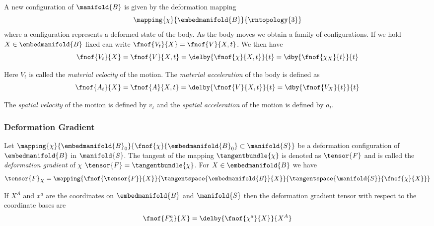 
A new configuration of $\manifold{B}$ is given by the deformation mapping
\begin{equation}
  \mapping{\chi}{\embedmanifold{B}}{\rntopology{3}}
\end{equation}
where a configuration represents a deformed state of the body. As the body
moves we obtain a family of configurations. If we hold $X\in\embedmanifold{B}$
fixed can write $\fnof{V_{t}}{X}=\fnof{V}{X,t}$. We then have
\begin{equation}
  \fnof{V_{t}}{X}=\fnof{V}{X,t}=\delby{\fnof{\chi}{X,t}}{t}=\dby{\fnof{\chi_{X}}{t}}{t}
\end{equation}

Here $V_{t}$ is called the \textit{material velocity} of the motion. The
\textit{material acceleration} of the body is defined as
\begin{equation}
  \fnof{A_{t}}{X}=\fnof{A}{X,t}=\delby{\fnof{V}{X,t}}{t}=\dby{\fnof{V_{X}}{t}}{t}
\end{equation}

The \textit{spatial velocity} of the motion is defined by $v_{t}$ and the
\textit{spatial acceleration} of the motion is defined by $a_{t}$.

\subsubsection{Deformation Gradient}

Let
$\mapping{\chi}{\embedmanifold{B}_{0}}{\fnof{\chi}{\embedmanifold{B}_{0}}\subset\manifold{S}}$
be a deformation configuration of $\embedmanifold{B}$ in $\manifold{S}$. The
tangent of the mapping \ie $\tangentbundle{\chi}$ is denoted as $\tensor{F}$
and is called the \textit{deformation gradient} of $\chi$ \ie
$\tensor{F}=\tangentbundle{\chi}$. For $X\in\embedmanifold{B}$ we have
\begin{equation}
  \tensor{F}_{X}=\mapping{\fnof{\tensor{F}}{X}}{\tangentspace{\embedmanifold{B}}{X}}{\tangentspace{\manifold{S}}{\fnof{\chi}{X}}}
\end{equation}
 
If $X^{A}$ and $x^{a}$ are the coordinates on $\embedmanifold{B}$ and
$\manifold{S}$ then the deformation gradient tensor with respect to the
coordinate bases are
\begin{equation}
  \fnof{F^{a}_{A}}{X}=\delby{\fnof{\chi^{a}}{X}}{X^{A}}
\end{equation}

